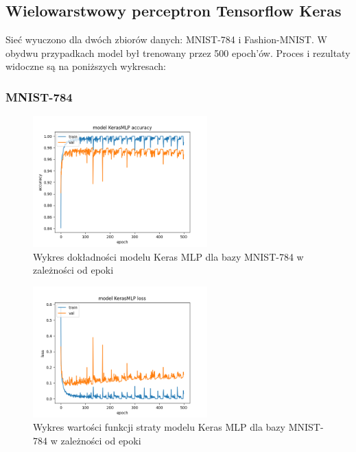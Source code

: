 \documentclass{article}
\begin{document}
\subsection{Wielowarstwowy perceptron Tensorflow Keras}

Sieć wyuczono dla dwóch zbiorów danych: MNIST-784 i Fashion-MNIST.
W obydwu przypadkach model był trenowany przez 500 epoch'ów.
Proces i rezultaty widoczne są na poniższych wykresach:

\subsubsection{MNIST-784}
\begin{figure}[H]
    \centering
    \includegraphics[width=0.6\textwidth]{../Saves/KerasMLP/mnist-784/KerasMLP_mnist_784_ep500_acc.png}
    \caption{Wykres dokładności modelu Keras MLP dla bazy MNIST-784 w zależności od epoki}
\end{figure}

\begin{figure}[H]
    \centering
    \includegraphics[width=0.6\textwidth]{../Saves/KerasMLP/mnist-784/KerasMLP_mnist_784_ep500_loss.png}
    \caption{Wykres wartości funkcji straty modelu Keras MLP dla bazy MNIST-784 w zależności od epoki} 
\end{figure}
\end{document}
